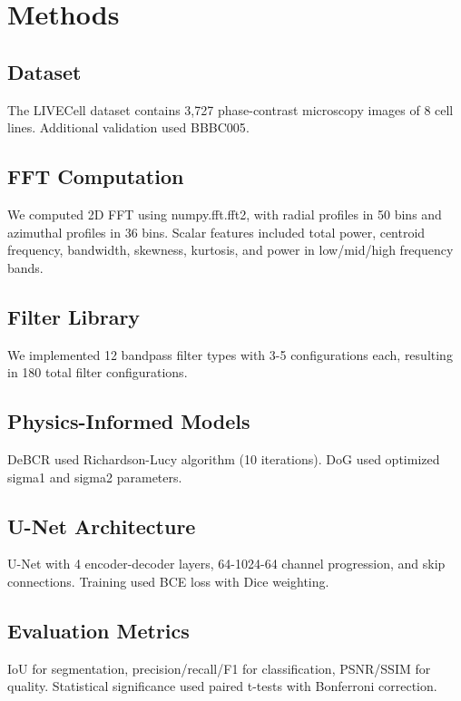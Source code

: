\documentclass[10pt,twocolumn]{article}
\begin{document}
\section*{Methods}

\subsection*{Dataset}
The LIVECell dataset\cite{Eliceiri2021} contains 3,727 phase-contrast microscopy images of 8 cell lines. Additional validation used BBBC005\cite{Caicedo2019}.

\subsection*{FFT Computation}
We computed 2D FFT using numpy.fft.fft2, with radial profiles in 50 bins and azimuthal profiles in 36 bins. Scalar features included total power, centroid frequency, bandwidth, skewness, kurtosis, and power in low/mid/high frequency bands.

\subsection*{Filter Library}
We implemented 12 bandpass filter types with 3-5 configurations each, resulting in 180 total filter configurations.

\subsection*{Physics-Informed Models}
DeBCR used Richardson-Lucy algorithm (10 iterations). DoG used optimized sigma1 and sigma2 parameters.

\subsection*{U-Net Architecture}
U-Net with 4 encoder-decoder layers, 64-1024-64 channel progression, and skip connections. Training used BCE loss with Dice weighting.

\subsection*{Evaluation Metrics}
IoU for segmentation, precision/recall/F1 for classification, PSNR/SSIM for quality. Statistical significance used paired t-tests with Bonferroni correction.
\end{document}
